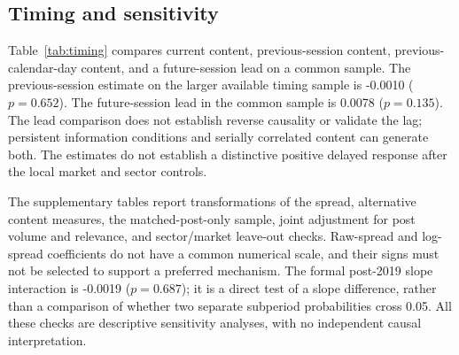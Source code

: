 \subsection{Timing and sensitivity}
Table~\ref{tab:timing} compares current content, previous-session content, previous-calendar-day content, and a future-session lead on a common sample. The previous-session estimate on the larger available timing sample is -0.0010 ($p=0.652$). The future-session lead in the common sample is 0.0078 ($p=0.135$). The lead comparison does not establish reverse causality or validate the lag; persistent information conditions and serially correlated content can generate both. The estimates do not establish a distinctive positive delayed response after the local market and sector controls.

The supplementary tables report transformations of the spread, alternative content measures, the matched-post-only sample, joint adjustment for post volume and relevance, and sector/market leave-out checks. Raw-spread and log-spread coefficients do not have a common numerical scale, and their signs must not be selected to support a preferred mechanism. The formal post-2019 slope interaction is -0.0019 ($p=0.687$); it is a direct test of a slope difference, rather than a comparison of whether two separate subperiod probabilities cross 0.05. All these checks are descriptive sensitivity analyses, with no independent causal interpretation.
